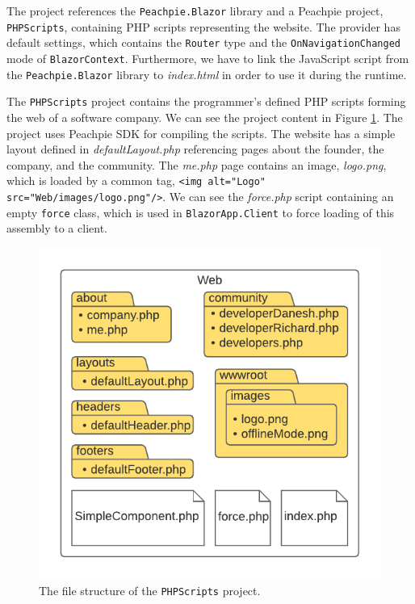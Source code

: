 \par
The project references the \texttt{Peachpie.Blazor} library and a Peachpie project, \texttt{PHPScripts}, containing PHP scripts representing the website.
The provider has default settings, which contains the \texttt{Router} type and the \texttt{OnNavigationChanged} mode of \texttt{BlazorContext}.
Furthermore, we have to link the JavaScript script from the \texttt{Peachpie.Blazor} library to \textit{index.html} in order to use it during the runtime.
\par
The \texttt{PHPScripts} project contains the programmer's defined PHP scripts forming the web of a software company.
We can see the project content in Figure \ref{img22:web}.
The project uses Peachpie SDK for compiling the scripts.
The website has a simple layout defined in \textit{defaultLayout.php} referencing pages about the founder, the company, and the community.
The \textit{me.php} page contains an image, \textit{logo.png}, which is loaded by a common tag, \texttt{<img alt="Logo" src="Web/images/logo\-.png"/>}.
We can see the \textit{force.php} script containing an empty \texttt{force} class, which is used in \texttt{BlazorApp.Client} to force loading of this assembly to a client.
\par
\begin{figure}
\centering
\includegraphics[scale=0.9]{./img/WebStructure}
\caption{The file structure of the \texttt{PHPScripts} project.}
\label{img22:web}
\end{figure} 
